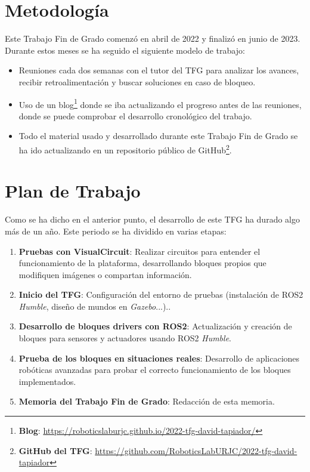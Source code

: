\newpage

\section{Metodología}
\label{sec:metod}

Este Trabajo Fin de Grado comenzó en abril de 2022 y finalizó en junio de 2023. Durante estos meses se ha seguido el siguiente modelo de trabajo: 

\begin{itemize}
	\item   Reuniones cada dos semanas con el tutor del TFG para analizar los avances, recibir retroalimentación y buscar soluciones en caso
                de bloqueo.
	\item   Uso de un blog\footnote{\textbf{Blog}: \url{https://roboticslaburjc.github.io/2022-tfg-david-tapiador/}} donde se iba actualizando el
                progreso antes de las reuniones, donde se puede comprobar el desarrollo cronológico del trabajo.
	\item   Todo el material usado y desarrollado durante este Trabajo Fin de Grado se ha ido actualizando en un repositorio público de
                GitHub\footnote{\textbf{GitHub del TFG}: \url{https://github.com/RoboticsLabURJC/2022-tfg-david-tapiador}}.
\end{itemize}

\section{Plan de Trabajo}
\label{sec:work_plan}

Como se ha dicho en el anterior punto, el desarrollo de este TFG ha durado algo más de un año. Este periodo se ha dividido en varias etapas: 

\begin{enumerate}
	\item   \textbf{Pruebas con VisualCircuit}: Realizar circuitos para entender el funcionamiento de la plataforma, desarrollando bloques
                propios que modifiquen imágenes o compartan información.
	\item   \textbf{Inicio del TFG}: Configuración del entorno de pruebas (instalación de ROS2 \textit{Humble}, diseño de mundos
                en \textit{Gazebo}...)..
    \item   \textbf{Desarrollo de bloques drivers con ROS2}: Actualización y creación de bloques para sensores y actuadores usando ROS2 \textit{Humble}.
    \item   \textbf{Prueba de los bloques en situaciones reales}: Desarrollo de aplicaciones robóticas avanzadas para probar el correcto
                funcionamiento de los bloques implementados. 
    \item   \textbf{Memoria del Trabajo Fin de Grado}: Redacción de esta memoria. 
\end{enumerate}

